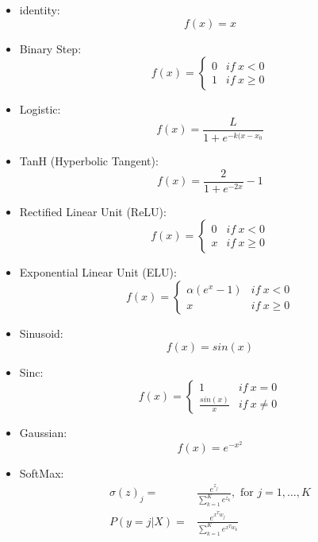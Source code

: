 \documentclass[font=12pt]{article}
\begin{document}
\begin{itemize}
\item identity:
\begin{equation}
f(x) = x
\end{equation}
\item Binary Step:
\begin{equation}
f(x) =
\begin{cases}
0 & if~x < 0\\
1 & if~x \geq 0
\end{cases}
\end{equation}
\item Logistic:
\begin{equation}
f(x) = \frac{L}{1 + e^{-k(x - x_0}}
\end{equation}
\item TanH (Hyperbolic Tangent):
\begin{equation}
f(x) = \frac{2}{1+e^{-2x}} - 1
\end{equation}
\item Rectified Linear Unit (ReLU):
\begin{equation}
f(x) =
\begin{cases}
0 & if~x < 0\\
x & if~x \geq 0
\end{cases}
\end{equation}
\item Exponential Linear Unit (ELU):
\begin{equation}
f(x) =
\begin{cases}
\alpha (e^x -1) & if~x < 0\\
x & if~x \geq 0
\end{cases}
\end{equation}
\item Sinusoid:
\begin{equation}
f(x) = sin(x)
\end{equation}
\item Sinc:
\begin{equation}
f(x) =
\begin{cases}
1 & if~x=0\\
\frac{sin(x)}{x} & if~x \neq 0
\end{cases}
\end{equation}
\item Gaussian:
\begin{equation}
f(x) = e^{-x^2}
\end{equation}
\item SoftMax:
\begin{equation}
\begin{split}
\sigma(z)_j =& \frac{e^{z_j}}{\sum_{k=1}^{K} e^{z_k}},\text{ for } j= 1,\dots,K\\
P(y=j|X)=& \frac{e^{x^T w_j}}{\sum_{k=1}^{K} e^{x^T w_k}}
\end{split}
\end{equation}
\end{itemize}
\end{document}
